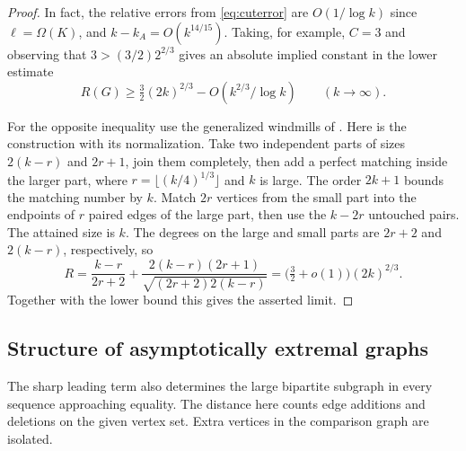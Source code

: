 \documentclass[11pt]{article}
\theoremstyle{remark}\newtheorem{remark}[theorem]{Remark}
\begin{document}
\begin{proof}
In fact, the relative errors from \eqref{eq:cuterror} are
$O(1/\log k)$ since $\ell=\Omega(K)$, and $k-k_A=O(k^{14/15})$.
Taking, for example, $C=3$ and observing that $3>(3/2)2^{2/3}$ gives
an absolute implied constant in the lower estimate
\[
 R(G)\ge \tfrac32(2k)^{2/3}-O(k^{2/3}/\log k)\qquad(k\to\infty).
\]

For the opposite inequality use the generalized windmills of
\cite[Proposition~7]{AGGHT}. Here is the construction with its
normalization. Take two independent parts of sizes $2(k-r)$ and $2r+1$,
join them completely, then add a perfect matching inside the larger
part, where $r=\lfloor(k/4)^{1/3}\rfloor$ and $k$ is large. The order
$2k+1$ bounds the matching number by $k$. Match $2r$ vertices from the
small part into the endpoints of $r$ paired edges of the large part,
then use the $k-2r$ untouched pairs. The attained size is $k$.
The degrees on the large and small parts are $2r+2$ and
$2(k-r)$, respectively, so
\[
 R=\frac{k-r}{2r+2}
 +\frac{2(k-r)(2r+1)}{\sqrt{(2r+2)2(k-r)}}
 =\bigl(\tfrac32+o(1)\bigr)(2k)^{2/3}.
\]
Together with the lower bound this gives the asserted limit.
\end{proof}
\subsection{Structure of asymptotically extremal graphs}

The sharp leading term also determines the large bipartite subgraph in
every sequence approaching equality. The distance here counts edge
additions and deletions on the given vertex set. Extra vertices in the
comparison graph are isolated.
\end{document}
